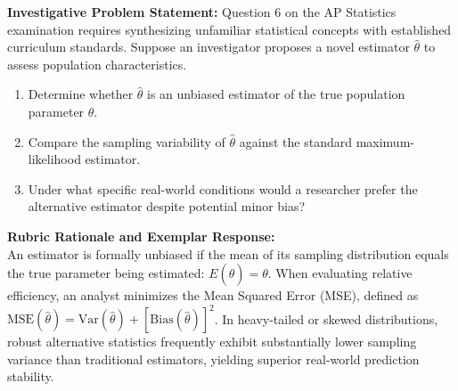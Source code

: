 \begin{frqrubricbox}
\textbf{Investigative Problem Statement:} Question 6 on the AP Statistics examination requires synthesizing unfamiliar statistical concepts with established curriculum standards. Suppose an investigator proposes a novel estimator $\hat{\theta}$ to assess population characteristics.
\begin{enumerate}[label=(\alph*)]
  \item Determine whether $\hat{\theta}$ is an unbiased estimator of the true population parameter $\theta$.
  \item Compare the sampling variability of $\hat{\theta}$ against the standard maximum-likelihood estimator.
  \item Under what specific real-world conditions would a researcher prefer the alternative estimator despite potential minor bias?
\end{enumerate}
\textbf{Rubric Rationale and Exemplar Response:}\\
An estimator is formally unbiased if the mean of its sampling distribution equals the true parameter being estimated: $E(\hat{\theta}) = \theta$. When evaluating relative efficiency, an analyst minimizes the Mean Squared Error (MSE), defined as $\text{MSE}(\hat{\theta}) = \text{Var}(\hat{\theta}) + [\text{Bias}(\hat{\theta})]^2$. In heavy-tailed or skewed distributions, robust alternative statistics frequently exhibit substantially lower sampling variance than traditional estimators, yielding superior real-world prediction stability.
\end{frqrubricbox}\vspace{6pt}
